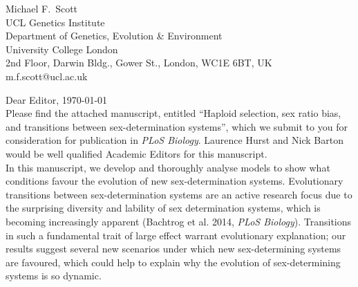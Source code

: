 \documentclass[12pt,letterpaper]{article}
\begin{document}
\thispagestyle{empty}

\noindent Michael F.\ Scott\\
UCL Genetics Institute\\
Department of Genetics, Evolution \& Environment\\
University College London \\
2nd Floor, Darwin Bldg., Gower St., London, WC1E 6BT, UK\\
 m.f.scott@ucl.ac.uk\\


\noindent Dear Editor, \hfill \today \\

Please find the attached manuscript, entitled ``Haploid selection, sex ratio bias, and transitions between sex-determination systems'', which we submit to you for consideration for publication in \textit{PLoS Biology}. Laurence Hurst and Nick Barton would be well qualified Academic Editors for this manuscript. 
\\

In this manuscript, we develop and thoroughly analyse models to show what conditions favour the evolution of new sex-determination systems. Evolutionary transitions between sex-determination systems are an active research focus due to the surprising diversity and lability of sex determination systems, which is becoming increasingly apparent (Bachtrog et al. 2014, \textit{PLoS Biology}). Transitions in such a fundamental trait of large effect warrant evolutionary explanation; our results suggest several new scenarios under which new sex-determining systems are favoured, which could help to explain why the evolution of sex-determining systems is so dynamic.  \\
\end{document}
